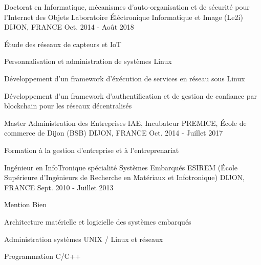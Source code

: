 

\begin{cventries}

  \cventry
    {Doctorat en Informatique, mécanismes d'auto-organisation et de sécurité pour l'Internet des Objets} %
    {Laboratoire \'Eléctronique Informatique et Image (Le2i)} %
    {DIJON, FRANCE} %
    {Oct. 2014 - Août 2018} %
    {
      \begin{cvitems} %
      \item {\'Etude des réseaux de capteurs et IoT}
      \item {Personnalisation et administration de systèmes Linux}
      \item {Développement d'un framework d'éxécution de services en réseau sous Linux}
      \item {Développement d'un framework d'authentification et de gestion de confiance par blockchain pour les réseaux décentralisés}
      \end{cvitems}
    }

  \cventry
    {Master Administration des Entreprises} %
    {IAE, Incubateur PREMICE, \'Ecole de commerce de Dijon (BSB)} %
    {DIJON, FRANCE} %
    {Oct. 2014 - Juillet 2017} %
    {
      \begin{cvitems} %
      \item {Formation à la gestion d'entreprise et à l'entreprenariat}
      \end{cvitems}
    }

  \cventry
    {Ingénieur en InfoTronique spécialité Systèmes Embarqués} %
    {ESIREM (\'Ecole Supérieure d'Ingénieurs de Recherche en Matériaux et Infotronique)} %
    {DIJON, FRANCE} %
    {Sept. 2010 - Juillet 2013} %
    {
      \begin{cvitems} %
      \item {Mention Bien}
      \item {Architecture matérielle et logicielle des systèmes embarqués}
      \item {Administration systèmes UNIX / Linux et réseaux}
      \item {Programmation C/C++}
      \end{cvitems}
    }


\end{cventries}
